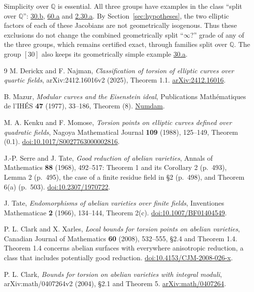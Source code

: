 \documentclass[11pt]{article}
\newcommand{\Q}{\mathbb Q}
\begin{document}
Simplicity over \(\Q\) is essential. All three groups have examples in
the class ``split over \(\Q\)'':
\href{https://genus-2-torsion.github.io/curve.html?id=30.b}{30.b},
\href{https://genus-2-torsion.github.io/curve.html?id=60.a}{60.a} and
\href{https://genus-2-torsion.github.io/curve.html?id=2.30.a}{2.30.a}.
By Section~\ref{sec:hypotheses}, the two elliptic factors of each of
these Jacobians are not geometrically isogenous. Thus these exclusions
do not change the combined geometrically split ``\(\infty\)?'' grade of
any of the three groups, which remains certified exact, through
families split over \(\Q\). The group \([30]\) also keeps its
geometrically simple example
\href{https://genus-2-torsion.github.io/curve.html?id=30.a}{30.a}.

\begin{thebibliography}{9}
M. Derickx and F. Najman,
\emph{Classification of torsion of elliptic curves over quartic
fields}, arXiv:2412.16016v2 (2025), Theorem 1.1.
\href{https://arxiv.org/abs/2412.16016v2}{arXiv:2412.16016}.

B. Mazur,
\emph{Modular curves and the Eisenstein ideal}, Publications
Math\'ematiques de l'IH\'ES \textbf{47} (1977), 33--186, Theorem (8).
\href{https://www.numdam.org/item/PMIHES_1977__47__33_0/}{Numdam}.

M. A. Kenku and F. Momose,
\emph{Torsion points on elliptic curves defined over quadratic fields},
Nagoya Mathematical Journal \textbf{109} (1988), 125--149,
Theorem (0.1).
\href{https://doi.org/10.1017/S0027763000002816}{doi:10.1017/S0027763000002816}.

J.-P. Serre and J. Tate,
\emph{Good reduction of abelian varieties}, Annals of Mathematics
\textbf{88} (1968), 492--517: Theorem 1 and its Corollary 2 (p.~493),
Lemma 2 (p.~495), the case of a finite residue field in \S2 (p.~498),
and Theorem 6(a) (p.~503).
\href{https://doi.org/10.2307/1970722}{doi:10.2307/1970722}.

J. Tate,
\emph{Endomorphisms of abelian varieties over finite fields},
Inventiones Mathematicae \textbf{2} (1966), 134--144, Theorem 2(c).
\href{https://doi.org/10.1007/BF01404549}{doi:10.1007/BF01404549}.

P. L. Clark and X. Xarles,
\emph{Local bounds for torsion points on abelian varieties},
Canadian Journal of Mathematics \textbf{60} (2008), 532--555, \S2.4
and Theorem 1.4. Theorem 1.4 concerns abelian surfaces with everywhere
anisotropic reduction, a class that includes potentially good
reduction.
\href{https://doi.org/10.4153/CJM-2008-026-x}{doi:10.4153/CJM-2008-026-x}.

P. L. Clark,
\emph{Bounds for torsion on abelian varieties with integral moduli},
arXiv:math/0407264v2 (2004), \S2.1 and Theorem 5.
\href{https://arxiv.org/abs/math/0407264}{arXiv:math/0407264}.
\end{thebibliography}
\end{document}

